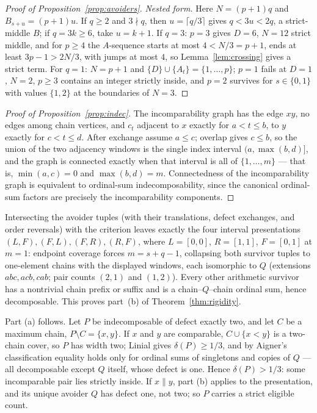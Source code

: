 \documentclass[11pt]{article}
\theoremstyle{definition}
\theoremstyle{remark}
\begin{document}
\begin{proof}[Proof of Proposition~\ref{prop:avoiders}]
\emph{Nested form.} Here $N=(p+1)q$ and $B_{s+u}=(p+1)u$. If $q\ge2$ and $3\nmid q$,
then $u=\lceil q/3\rceil$ gives $q<3u<2q$, a strict-middle $B$; if $q=3k\ge6$, take
$u=k+1$. If $q=3$: $p=3$ gives $D=6$, $N=12$ strict middle, and for $p\ge4$ the
$A$-sequence starts at most $4<N/3=p+1$, ends at least $3p-1>2N/3$, with jumps at most
$4$, so Lemma~\ref{lem:crossing} gives a strict term. For $q=1$: $N=p+1$ and
$\{D\}\cup\{A_t\}=\{1,\dots,p\}$; $p=1$ fails at $D=1$, $N=2$, $p\ge3$ contains an
integer strictly inside, and $p=2$ survives for $s\in\{0,1\}$ with values $\{1,2\}$ at
the boundaries of $N=3$.
\end{proof}

\begin{proof}[Proof of Proposition~\ref{prop:indec}]
The incomparability graph has the edge $xy$, no edges among chain vertices, and $c_t$
adjacent to $x$ exactly for $a<t\le b$, to $y$ exactly for $c<t\le d$. After exchange
assume $a\le c$; overlap gives $c\le b$, so the union of the two adjacency windows is the
single index interval $(a,\max(b,d)]$, and the graph is connected exactly when that
interval is all of $\{1,\dots,m\}$ --- that is, $\min(a,c)=0$ and $\max(b,d)=m$.
Connectedness of the incomparability graph is equivalent to ordinal-sum
indecomposability, since the canonical ordinal-sum factors are precisely the
incomparability components. %
\end{proof}

Intersecting the avoider tuples (with their translations, defect exchanges, and order
reversals) with the criterion leaves exactly the four interval presentations
$(L,F),(F,L),(F,R),(R,F)$, where $L=[0,0]$, $R=[1,1]$, $F=[0,1]$ at $m=1$: endpoint
coverage forces $m=s+q-1$, collapsing both survivor tuples to one-element chains with
the displayed windows, each isomorphic to $Q$ (extensions $abc,acb,cab$; pair counts
$(2,1)$ and $(1,2)$). Every other arithmetic survivor has a nontrivial chain prefix or
suffix and is a chain--$Q$--chain ordinal sum, hence decomposable. This proves
part~(b) of Theorem~\ref{thm:rigidity}.

Part (a) follows. Let $P$ be indecomposable of defect exactly two, and let $C$ be a
maximum chain, $P\setminus C=\{x,y\}$. If $x$ and $y$ are comparable, $C\cup\{x<y\}$ is
a two-chain cover, so $P$ has width two; Linial \cite{linial} gives $\delta(P)\ge1/3$,
and by Aigner's classification \cite{aigner} equality holds only for ordinal sums of
singletons and copies of $Q$ --- all decomposable except $Q$ itself, whose defect is
one. Hence $\delta(P)>1/3$: some incomparable pair lies strictly inside. If $x\parallel
y$, part (b) applies to the presentation, and its unique avoider $Q$ has defect one,
not two; so $P$ carries a strict eligible count.
\end{document}
